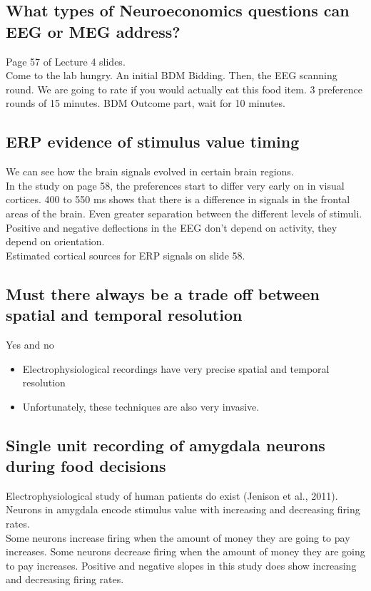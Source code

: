 \subsection{What types of Neuroeconomics questions can EEG or MEG address?}
Page 57 of Lecture 4 slides.
\\Come to the lab hungry. An initial BDM Bidding. Then, the EEG scanning round. We are going to rate if you would actually eat this food item. 3 preference rounds of 15 minutes. BDM Outcome part, wait for 10 minutes.

\subsection{ERP evidence of stimulus value timing}
We can see how the brain signals evolved in certain brain regions. 
\\In the study on page 58, the preferences start to differ very early on in visual cortices. 400 to 550 ms shows that there is a difference in signals in the frontal areas of the brain. Even greater separation between the different levels of stimuli.
\\Positive and negative deflections in the EEG don't depend on activity, they depend on orientation.
\\Estimated cortical sources for ERP signals on slide 58.

\subsection{Must there always be a trade off between spatial and temporal resolution}
Yes and no
\begin{itemize}
    \item Electrophysiological recordings have very precise spatial and temporal resolution
    \item Unfortunately, these techniques are also very invasive.
\end{itemize}
\subsection{Single unit recording of amygdala neurons during food decisions}
Electrophysiological study of human patients do exist (Jenison et al., 2011).
Neurons in amygdala encode stimulus value with increasing and decreasing firing rates. 
\\Some neurons increase firing when the amount of money they are going to pay increases. Some neurons decrease firing when the amount of money they are going to pay increases. Positive and negative slopes in this study does show increasing and decreasing firing rates. 

